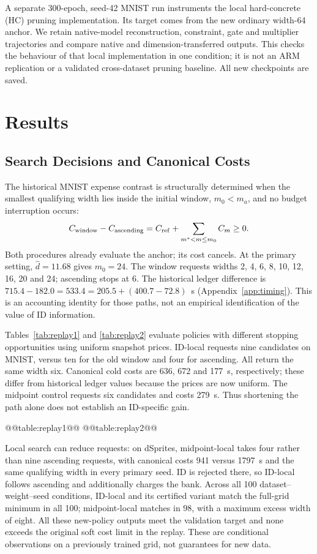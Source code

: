 A separate 300-epoch, seed-42 MNIST run instruments the local
hard-concrete (HC) pruning implementation. Its target comes from the
new ordinary width-64 anchor. We retain native-model reconstruction,
constraint, gate and multiplier trajectories and compare native and
dimension-transferred outputs. This checks the behaviour of that local
implementation in one condition; it is not an ARM replication or a
validated cross-dataset pruning baseline. All new checkpoints are saved.

\section{Results}\label{sec:results}

\subsection{Search Decisions and Canonical Costs}\label{sec:replayresults}
The historical MNIST expense contrast is structurally determined when
the smallest qualifying width lies inside the initial window,
$m_0<m_a$, and no budget interruption occurs:
\begin{equation}
 C_{\rm window}-C_{\rm ascending}
 =C_{\rm ref}+\sum_{m^*<m\le m_0}C_m\ge0.
 \label{eq:dominance}
\end{equation}
Both procedures already evaluate the anchor; its cost cancels.
At the primary setting, $\hat d=11.68$ gives $m_0=24$.
The window requests widths 2, 4, 6, 8, 10, 12, 16, 20 and 24;
ascending stops at 6. The historical ledger difference is
$715.4-182.0=533.4=205.5+(400.7-72.8)$~s
(Appendix~\ref{app:timing}). This is an accounting identity for those
paths, not an empirical identification of the value of ID information.

Tables~\ref{tab:replay1} and \ref{tab:replay2} evaluate policies with
different stopping opportunities using uniform snapshot prices.
ID-local requests nine candidates on MNIST, versus ten for the old
window and four for ascending. All return the same width six.
Canonical cold costs are 636, 672 and 177~s, respectively; these differ
from historical ledger values because the prices are now uniform.
The midpoint control requests six candidates and costs 279~s.
Thus shortening the path alone does not establish an ID-specific gain.

@@table:replay1@@
@@table:replay2@@

Local search can reduce requests: on dSprites, midpoint-local takes
four rather than nine ascending requests, with canonical costs 941
versus 1797~s and the same qualifying width in every primary seed.
ID is rejected there, so ID-local follows ascending and additionally
charges the bank. Across all 100 dataset--weight--seed conditions,
ID-local and its certified variant match the full-grid minimum in all
100; midpoint-local matches in 98, with a maximum excess width of eight.
All these new-policy outputs meet the validation target and none exceeds
the original soft cost limit in the replay. These are conditional
observations on a previously trained grid, not guarantees for new data.


